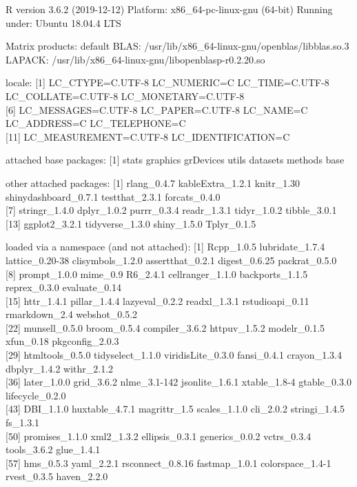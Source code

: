 \documentclass[
]{article}
\begin{document}
R version 3.6.2 (2019-12-12) Platform: x86\_64-pc-linux-gnu (64-bit)
Running under: Ubuntu 18.04.4 LTS

Matrix products: default BLAS:
/usr/lib/x86\_64-linux-gnu/openblas/libblas.so.3 LAPACK:
/usr/lib/x86\_64-linux-gnu/libopenblasp-r0.2.20.so

locale: {[}1{]} LC\_CTYPE=C.UTF-8 LC\_NUMERIC=C LC\_TIME=C.UTF-8
LC\_COLLATE=C.UTF-8 LC\_MONETARY=C.UTF-8\\
{[}6{]} LC\_MESSAGES=C.UTF-8 LC\_PAPER=C.UTF-8 LC\_NAME=C LC\_ADDRESS=C
LC\_TELEPHONE=C\\
{[}11{]} LC\_MEASUREMENT=C.UTF-8 LC\_IDENTIFICATION=C

attached base packages: {[}1{]} stats graphics grDevices utils datasets
methods base

other attached packages: {[}1{]} rlang\_0.4.7 kableExtra\_1.2.1
knitr\_1.30 shinydashboard\_0.7.1 testthat\_2.3.1 forcats\_0.4.0\\
{[}7{]} stringr\_1.4.0 dplyr\_1.0.2 purrr\_0.3.4 readr\_1.3.1
tidyr\_1.0.2 tibble\_3.0.1\\
{[}13{]} ggplot2\_3.2.1 tidyverse\_1.3.0 shiny\_1.5.0 Tplyr\_0.1.5

loaded via a namespace (and not attached): {[}1{]} Rcpp\_1.0.5
lubridate\_1.7.4 lattice\_0.20-38 clisymbols\_1.2.0 assertthat\_0.2.1
digest\_0.6.25 packrat\_0.5.0\\
{[}8{]} prompt\_1.0.0 mime\_0.9 R6\_2.4.1 cellranger\_1.1.0
backports\_1.1.5 reprex\_0.3.0 evaluate\_0.14\\
{[}15{]} httr\_1.4.1 pillar\_1.4.4 lazyeval\_0.2.2 readxl\_1.3.1
rstudioapi\_0.11 rmarkdown\_2.4 webshot\_0.5.2\\
{[}22{]} munsell\_0.5.0 broom\_0.5.4 compiler\_3.6.2 httpuv\_1.5.2
modelr\_0.1.5 xfun\_0.18 pkgconfig\_2.0.3\\
{[}29{]} htmltools\_0.5.0 tidyselect\_1.1.0 viridisLite\_0.3.0
fansi\_0.4.1 crayon\_1.3.4 dbplyr\_1.4.2 withr\_2.1.2\\
{[}36{]} later\_1.0.0 grid\_3.6.2 nlme\_3.1-142 jsonlite\_1.6.1
xtable\_1.8-4 gtable\_0.3.0 lifecycle\_0.2.0\\
{[}43{]} DBI\_1.1.0 huxtable\_4.7.1 magrittr\_1.5 scales\_1.1.0
cli\_2.0.2 stringi\_1.4.5 fs\_1.3.1\\
{[}50{]} promises\_1.1.0 xml2\_1.3.2 ellipsis\_0.3.1 generics\_0.0.2
vctrs\_0.3.4 tools\_3.6.2 glue\_1.4.1\\
{[}57{]} hms\_0.5.3 yaml\_2.2.1 rsconnect\_0.8.16 fastmap\_1.0.1
colorspace\_1.4-1 rvest\_0.3.5 haven\_2.2.0
\end{document}
